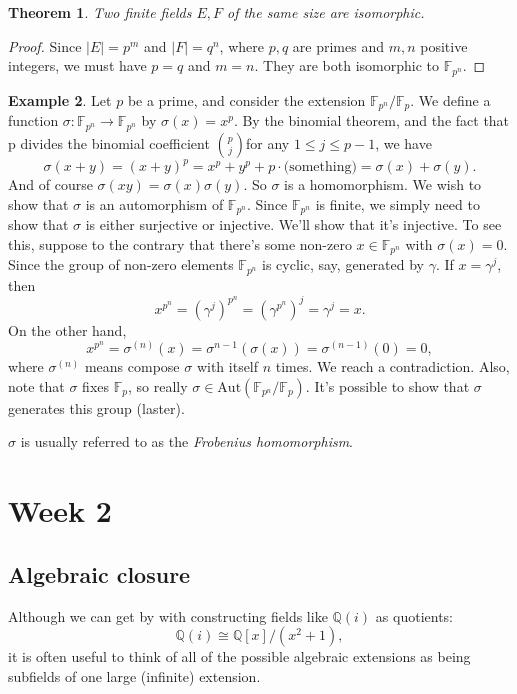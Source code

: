 \documentclass[12pt]{report}
\newtheorem{thm}{Theorem}[section]
\theoremstyle{definition}
\newtheorem{example}[thm]{Example}
\def\QQ{\mathbb{Q}}
\def\FF{\mathbb{F}}
\def\Aut{\text{Aut}}
\begin{document}
\begin{thm}
    Two finite fields $E,F$ of the same size are isomorphic.
\end{thm}

\begin{proof}
    Since $|E|=p^m$ and $|F|=q^n$, where $p,q$ are primes and $m,n$ positive integers, we must have $p=q$ and $m=n$. They are both isomorphic to $\FF_{p^n}$.
\end{proof}

\begin{example}
    Let $p$ be a prime, and consider the extension $\FF_{p^n}/\FF_p$. We define a function $\sigma: \FF_{p^n} \to \FF_{p^n}$ by $\sigma(x) = x^p$. By the binomial theorem, and the fact that p divides the binomial coefficient $\binom{p}{j}$for any $1 \leq j \leq p-1$, we have $$\sigma(x + y) = (x + y)^p = x^p + y^p + p\cdot \mbox{(something)} = \sigma(x) + \sigma(y).$$
    And of course $\sigma(xy) = \sigma(x)\sigma(y)$. So $\sigma$ is a homomorphism. We wish to show that $\sigma$ is an automorphism of $\FF_{p^n}$. Since $\FF_{p^n}$ is finite, we simply need to show that $\sigma$ is either surjective or injective. We'll show that it's injective. To see this, suppose to the contrary that there's some non-zero $x \in \FF_{p^n}$ with $\sigma(x) = 0$. Since the group of non-zero elements $\FF_{p^n}$ is cyclic, say, generated by $\gamma$. If $x =\gamma^j$, then $$x^{p^n} = (\gamma^j)^{p^n} = (\gamma^{p^n})^j = \gamma^j = x.$$
    On the other hand,  $$x^{p^n}= \sigma^{(n)}(x) = \sigma^{n-1}(\sigma(x)) = \sigma^{(n-1)}(0) = 0,$$ where $\sigma^{(n)}$ means compose $\sigma$ with itself $n$ times. We reach a contradiction.
    Also, note that $\sigma$ fixes $\FF_p$, so really $\sigma \in \Aut(\FF_{p^n}/\FF_p)$. It's possible to show that $\sigma$ generates this group (laster).

    $\sigma$ is usually referred to as the \emph{Frobenius homomorphism}.
\end{example}

\chapter*{Week 2}
\setcounter{chapter}{2}

\section{Algebraic closure}

Although we can get by with constructing fields like $\QQ(i)$ as quotients:
$$\QQ(i) \cong \QQ[x]/(x^2 + 1),$$
it is often useful to think of all of the possible algebraic extensions as being subfields of one large (infinite) extension.
\end{document}
